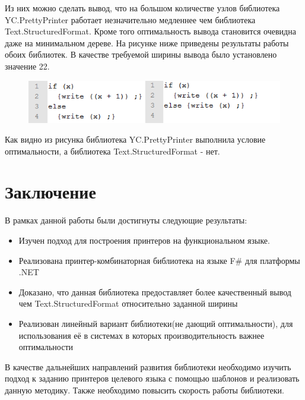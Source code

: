 \documentclass{matmex-diploma}
\begin{document}
\clearpage
Из них можно сделать вывод, что на большом количестве узлов библиотека YC.PrettyPrinter работает незначительно медленнее чем библиотека Text.StructuredFormat.
Кроме того оптимальность вывода становится очевидна даже на минимальном дереве. На рисунке ниже приведены результаты работы обоих библиотек. В качестве требуемой ширины вывода было установлено значение 22.
\par
\begin{figure}[h]
	\includegraphics{Images/image00.png}
	\caption{}
\end{figure}
\par
Как видно из рисунка  библиотека YC.PrettyPrinter выполнила условие оптимальности, а библиотека Text.StructuredFormat - нет.
\section{Заключение}
В рамках данной работы были достигнуты следующие результаты:
\begin{itemize}
    \item Изучен подход для построения принтеров на функциональном языке.
    \item Реализована принтер-комбинаторная библиотека на языке F\# для платформы .NET
    \item Доказано, что данная библиотека предоставляет более качественный вывод чем Text.StructuredFormat  относительно заданной ширины
    \item Реализован линейный вариант библиотеки(не дающий оптимальности), для использования её в системах в которых производительность важнее оптимальности
\end{itemize}
В качестве дальнейших направлений развития библиотеки необходимо изучить подход к заданию принтеров целевого языка с помощью шаблонов и реализовать данную методику. Также необходимо повысить скорость работы библиотеки.


\end{document}
